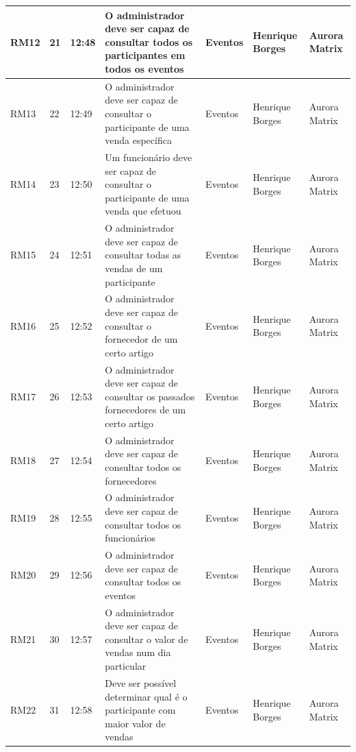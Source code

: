 \documentclass[a4paper,12pt]{scrreprt}
\begin{document}
\begin{table}[H]
{\begin{tabular}{|l|l|l|>{\raggedright\arraybackslash}p{12cm}|l|l|l|}
        RM12 & 21 & 12:48 & O administrador deve ser capaz de consultar todos os participantes em todos os eventos & Eventos & Henrique Borges & Aurora Matrix \\ \hline
        RM13 & 22 & 12:49 & O administrador deve ser capaz de consultar o participante de uma venda específica & Eventos & Henrique Borges & Aurora Matrix \\ \hline
        RM14 & 23 & 12:50 & Um funcionário deve ser capaz de consultar o participante de uma venda que efetuou & Eventos & Henrique Borges & Aurora Matrix \\ \hline
        RM15 & 24 & 12:51 & O administrador deve ser capaz de consultar todas as vendas de um participante & Eventos & Henrique Borges & Aurora Matrix \\ \hline
        RM16 & 25 & 12:52 & O administrador deve ser capaz de consultar o fornecedor de um certo artigo & Eventos & Henrique Borges & Aurora Matrix \\ \hline
        RM17 & 26 & 12:53 & O administrador deve ser capaz de consultar os passados fornecedores de um certo artigo & Eventos & Henrique Borges & Aurora Matrix \\ \hline
        RM18 & 27 & 12:54 & O administrador deve ser capaz de consultar todos os fornecedores & Eventos & Henrique Borges & Aurora Matrix \\ \hline
        RM19 & 28 & 12:55 & O administrador deve ser capaz de consultar todos os funcionários & Eventos & Henrique Borges & Aurora Matrix \\ \hline
        RM20 & 29 & 12:56 & O administrador deve ser capaz de consultar todos os eventos & Eventos & Henrique Borges & Aurora Matrix \\ \hline
        RM21 & 30 & 12:57 & O administrador deve ser capaz de consultar o valor de vendas num dia particular & Eventos & Henrique Borges & Aurora Matrix \\ \hline
        RM22 & 31 & 12:58 & Deve ser possível determinar qual é o participante com maior valor de vendas & Eventos & Henrique Borges & Aurora Matrix \\ \hline

\end{tabular}}
\end{table}
\end{document}
